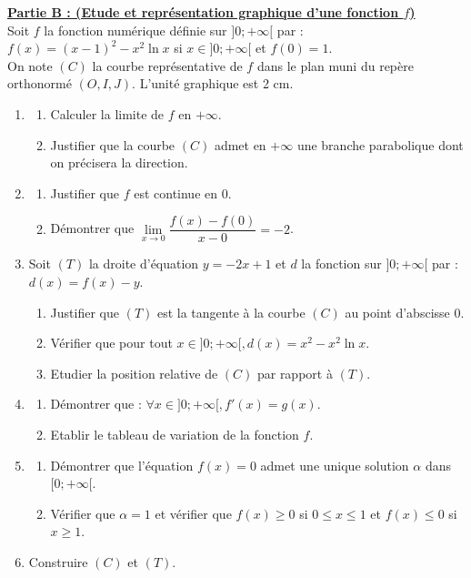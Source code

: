\documentclass[12pt,a4paper]{article}
\begin{document}
\vspace{0.5cm}

\noindent \underline{\textbf{Partie B : (Etude et représentation graphique d'une fonction $f$)}} \\
Soit $f$ la fonction numérique définie sur $]0; +\infty[$ par : \\
$f(x) = (x-1)^2 - x^2 \ln x$ si $x \in ]0; +\infty[$ et $f(0) = 1$. \\
On note $(C)$ la courbe représentative de $f$ dans le plan muni du repère orthonormé $(O, I, J)$. L'unité graphique est 2 cm.
\begin{enumerate}
    \item \begin{enumerate}
        \item Calculer la limite de $f$ en $+\infty$.
        \item Justifier que la courbe $(C)$ admet en $+\infty$ une branche parabolique dont on précisera la direction.
    \end{enumerate}
    \item \begin{enumerate}
        \item Justifier que $f$ est continue en 0.
        \item Démontrer que $\lim\limits_{x \to 0} \dfrac{f(x)-f(0)}{x-0} = -2$.
    \end{enumerate}
    \item Soit $(T)$ la droite d'équation $y = -2x + 1$ et $d$ la fonction sur $]0; +\infty[$ par : $d(x) = f(x) - y$.
    \begin{enumerate}
        \item Justifier que $(T)$ est la tangente à la courbe $(C)$ au point d'abscisse 0.
        \item Vérifier que pour tout $x \in ]0; +\infty[ , d(x) = x^2 - x^2\ln x$.
        \item Etudier la position relative de $(C)$ par rapport à $(T)$.
    \end{enumerate}
    \item \begin{enumerate}
        \item Démontrer que : $\forall x \in ]0; +\infty[ , f'(x) = g(x)$.
        \item Etablir le tableau de variation de la fonction $f$.
    \end{enumerate}
    \item \begin{enumerate}
        \item Démontrer que l'équation $f(x) = 0$ admet une unique solution $\alpha$ dans $[0; +\infty[$.
        \item Vérifier que $\alpha = 1$ et vérifier que $f(x) \ge 0$ si $0 \le x \le 1$ et $f(x) \le 0$ si $x \ge 1$.
    \end{enumerate}
    \item Construire $(C)$ et $(T)$.
\end{enumerate}
\end{document}
